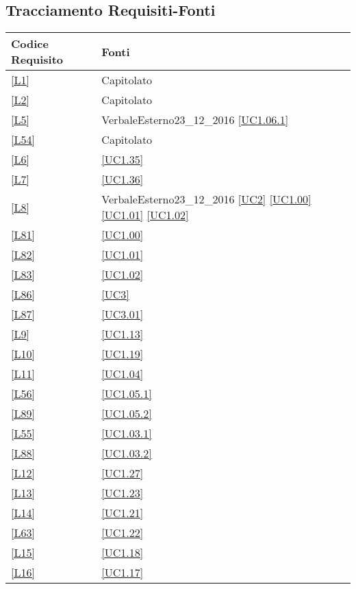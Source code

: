 \subsection{Tracciamento Requisiti-Fonti}

\begin{longtable}{|P{6cm}|P{6cm}|}
	\hline \textbf{Codice Requisito} & \textbf{Fonti}\\
	\hline \ref{L1} & Capitolato \\
	\hline \ref{L2} & Capitolato \\
	\hline \ref{L5} & VerbaleEsterno23\_12\_2016 \linebreak \ref{UC1.06.1}  \\	
	\hline \ref{L54} & Capitolato \\
	\hline \ref{L6} & \ref{UC1.35} \\
	\hline \ref{L7} & \ref{UC1.36} \\
	\hline \ref{L8} & VerbaleEsterno23\_12\_2016 \linebreak \ref{UC2} \linebreak \ref{UC1.00} \linebreak \ref{UC1.01} \linebreak \ref{UC1.02} \\
	\hline \ref{L81} & \ref{UC1.00} \\
	\hline \ref{L82} & \ref{UC1.01} \\
	\hline \ref{L83} & \ref{UC1.02} \\
	\hline \ref{L86} & \ref{UC3} \\
	\hline \ref{L87} & \ref{UC3.01} \\
	\hline \ref{L9} & \ref{UC1.13} \\
	\hline \ref{L10} & \ref{UC1.19} \\
	\hline \ref{L11} & \ref{UC1.04}  \\
	\hline \ref{L56} & \ref{UC1.05.1} \\
	\hline \ref{L89} & \ref{UC1.05.2} \\
	\hline \ref{L55} & \ref{UC1.03.1} \\
	\hline \ref{L88} & \ref{UC1.03.2} \\
	\hline \ref{L12} & \ref{UC1.27} \\
	\hline \ref{L13} & \ref{UC1.23} \\
	\hline \ref{L14} & \ref{UC1.21} \\
	\hline \ref{L63} & \ref{UC1.22} \\
	\hline \ref{L15} & \ref{UC1.18} \\
	\hline \ref{L16} & \ref{UC1.17} \\

\end{longtable}
